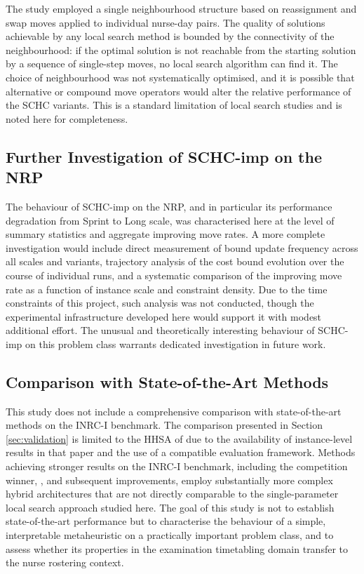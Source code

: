 \documentclass[12pt, a4paper, oneside]{report}
\begin{document}
The study employed a single neighbourhood structure based on
reassignment and swap moves applied to individual nurse-day pairs.
The quality of solutions achievable by any local search method is
bounded by the connectivity of the neighbourhood: if the optimal
solution is not reachable from the starting solution by a sequence
of single-step moves, no local search algorithm can find it. The
choice of neighbourhood was not systematically optimised, and it is
possible that alternative or compound move operators would alter the
relative performance of the SCHC variants. This is a standard
limitation of local search studies and is noted here for
completeness.

\subsection{Further Investigation of SCHC-imp on the NRP}
\label{sec:disc_imp_future}

The behaviour of SCHC-imp on the NRP, and in particular its
performance degradation from Sprint to Long scale, was characterised
here at the level of summary statistics and aggregate improving move
rates. A more complete investigation would include direct measurement
of bound update frequency across all scales and variants, trajectory
analysis of the cost bound evolution over the course of individual
runs, and a systematic comparison of the improving move rate as a
function of instance scale and constraint density. Due to the time
constraints of this project, such analysis was not conducted, though
the experimental infrastructure developed here would support it with
modest additional effort. The unusual and theoretically interesting
behaviour of SCHC-imp on this problem class warrants dedicated
investigation in future work.

\subsection{Comparison with State-of-the-Art Methods}
\label{sec:disc_sota}

This study does not include a comprehensive comparison with
state-of-the-art methods on the INRC-I benchmark. The comparison
presented in Section \ref{sec:validation} is limited to the HHSA
of \citet{Awadallah2015} due to the availability of instance-level
results in that paper and the use of a compatible evaluation
framework. Methods achieving stronger results on the INRC-I
benchmark, including the competition winner, \citet{Valouxis2012},
and subsequent improvements, employ substantially more complex
hybrid architectures that are not directly comparable to the
single-parameter local search approach studied here. The goal of
this study is not to establish state-of-the-art performance but to
characterise the behaviour of a simple, interpretable metaheuristic
on a practically important problem class, and to assess whether its
properties in the examination timetabling domain transfer to the
nurse rostering context.
\end{document}
